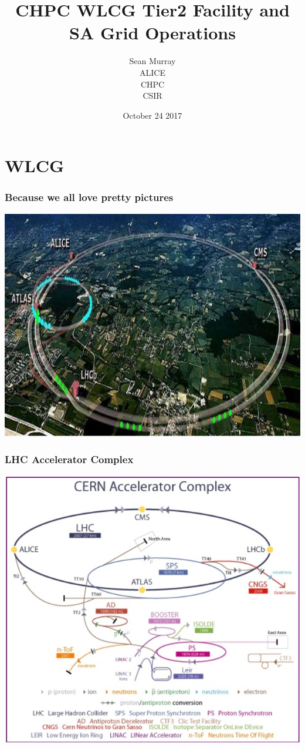 \documentclass{beamer}
\title{CHPC WLCG Tier2 Facility and SA Grid Operations}
\author{Sean Murray \\
    ALICE \\
    CHPC \\
    CSIR 
}
\date{October 24 2017}
\begin{document}
\begin{frame}
\titlepage
\end{frame}



\section{WLCG}
\begin{frame}
    \frametitle{Because we all love pretty pictures}
    \includegraphics[scale=0.3]{LHCTop.jpg}
\end{frame}

\begin{frame}
    \frametitle{LHC Accelerator Complex}
    \includegraphics[scale=0.5]{LHCAcceleratorComplex.jpg}
\end{frame}
\end{document}
